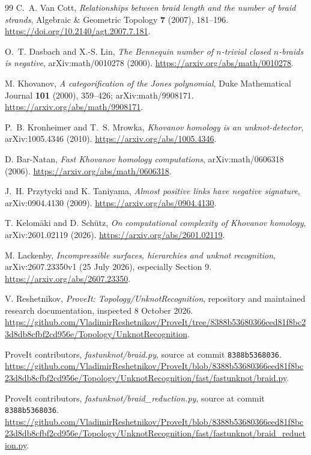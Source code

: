 \documentclass[11pt,letterpaper]{article}
\theoremstyle{definition}
\newcommand{\sourcepin}{\texttt{8388b5368036}}
\begin{document}
\clearpage
\begin{thebibliography}{99}
C.~A. Van Cott, \emph{Relationships between braid length and the number of braid strands}, Algebraic \& Geometric Topology \textbf{7} (2007), 181--196. \url{https://doi.org/10.2140/agt.2007.7.181}.

O.~T. Dasbach and X.-S. Lin, \emph{The Bennequin number of $n$-trivial closed $n$-braids is negative}, arXiv:math/0010278 (2000). \url{https://arxiv.org/abs/math/0010278}.

M. Khovanov, \emph{A categorification of the Jones polynomial}, Duke Mathematical Journal \textbf{101} (2000), 359--426; arXiv:math/9908171. \url{https://arxiv.org/abs/math/9908171}.

P.~B. Kronheimer and T.~S. Mrowka, \emph{Khovanov homology is an unknot-detector}, arXiv:1005.4346 (2010). \url{https://arxiv.org/abs/1005.4346}.

D. Bar-Natan, \emph{Fast Khovanov homology computations}, arXiv:math/0606318 (2006). \url{https://arxiv.org/abs/math/0606318}.

J.~H. Przytycki and K. Taniyama, \emph{Almost positive links have negative signature}, arXiv:0904.4130 (2009). \url{https://arxiv.org/abs/0904.4130}.

T. Kelom\"aki and D. Sch\"utz, \emph{On computational complexity of Khovanov homology}, arXiv:2601.02119 (2026). \url{https://arxiv.org/abs/2601.02119}.

M. Lackenby, \emph{Incompressible surfaces, hierarchies and unknot recognition}, arXiv:2607.23350v1 (25 July 2026), especially Section 9. \url{https://arxiv.org/abs/2607.23350}.

V. Reshetnikov, \emph{ProveIt: Topology/UnknotRecognition}, repository and maintained research documentation, inspected 8 October 2026. \url{https://github.com/VladimirReshetnikov/ProveIt/tree/8388b53680366eed81f8bc23d8db8cfbf2cd956e/Topology/UnknotRecognition}.

ProveIt contributors, \emph{fastunknot/braid.py}, source at commit \sourcepin. \url{https://github.com/VladimirReshetnikov/ProveIt/blob/8388b53680366eed81f8bc23d8db8cfbf2cd956e/Topology/UnknotRecognition/fast/fastunknot/braid.py}.

ProveIt contributors, \emph{fastunknot/braid\_reduction.py}, source at commit \sourcepin. \url{https://github.com/VladimirReshetnikov/ProveIt/blob/8388b53680366eed81f8bc23d8db8cfbf2cd956e/Topology/UnknotRecognition/fast/fastunknot/braid_reduction.py}.
\end{thebibliography}
\end{document}
